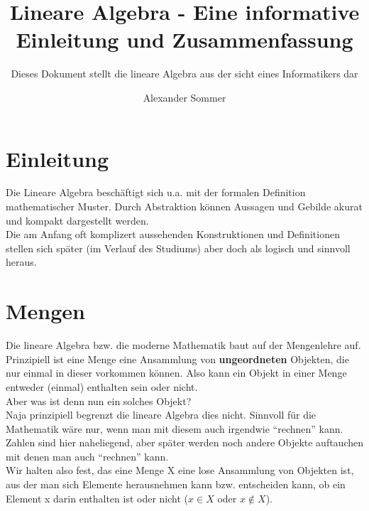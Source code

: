 \documentclass[parskip=full]{scrartcl}
\title{Lineare Algebra - Eine informative Einleitung und Zusammenfassung}
\subtitle{Dieses Dokument stellt die lineare Algebra aus der sicht eines Informatikers dar}
\author{Alexander Sommer}
\begin{document}
\maketitle

\section{Einleitung}
    Die Lineare Algebra beschäftigt sich u.a. mit der formalen Definition mathematischer Muster.
    Durch Abstraktion können Aussagen und Gebilde akurat und kompakt dargestellt werden.
    \\Die am Anfang oft komplizert aussehenden Konstruktionen und Definitionen stellen sich später
    (im Verlauf des Studiums) aber doch als logisch und sinnvoll heraus.

\section{Mengen}
    Die lineare Algebra bzw. die moderne Mathematik baut auf der Mengenlehre auf.
    Prinzipiell ist eine Menge eine Ansammlung von \textbf{ungeordneten} Objekten, die nur einmal in dieser vorkommen können.
    Also kann ein Objekt in einer Menge entweder (einmal) enthalten sein oder nicht.
    \\Aber was ist denn nun ein solches Objekt?
    \\Naja prinzipiell begrenzt die lineare Algebra dies nicht.
    Sinnvoll für die Mathematik wäre nur, wenn man mit diesem auch irgendwie \enquote{rechnen} kann. 
    Zahlen sind hier naheliegend, aber später werden noch andere Objekte auftauchen mit denen man auch \enquote{rechnen} kann.
    \\Wir halten also fest, das eine Menge X eine lose Ansammlung von Objekten ist, 
    aus der man sich Elemente herausnehmen kann bzw. entscheiden kann, ob ein Element x darin enthalten ist oder nicht (\(x \in X\) oder \(x\notin X\)).
    
\end{document}
